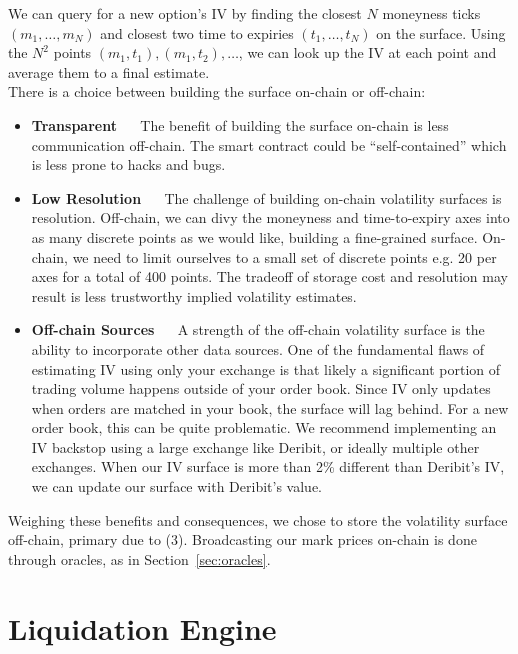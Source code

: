 \documentclass{article}
\begin{document}
\noindent We can query for a new option's IV by finding the closest $N$ moneyness ticks $(m_1, \ldots, m_N)$ and closest two time to expiries $(t_1, \ldots, t_N)$ on the surface.  Using the $N^2$ points $(m_1, t_1), (m_1, t_2), \ldots$, we can look up the IV at each point and average them to a final estimate. \\

\noindent There is a choice between building the surface on-chain or off-chain:

\begin{itemize}
    \item \textbf{Transparent} $\quad$ The benefit of building the surface on-chain is less communication off-chain. The smart contract could be ``self-contained'' which is less prone to hacks and bugs.
    \item \textbf{Low Resolution} $\quad$ The challenge of building on-chain volatility surfaces is resolution. Off-chain, we can divy the moneyness and time-to-expiry axes into as many discrete points as we would like, building a fine-grained surface. On-chain, we need to limit ourselves to a small set of discrete points e.g. 20 per axes for a total of 400 points. The tradeoff of storage cost and resolution may result is less trustworthy implied volatility estimates.
    \item \textbf{Off-chain Sources} $\quad$ A strength of the off-chain volatility surface is the ability to incorporate other data sources. One of the fundamental flaws of estimating IV using only your exchange is that likely a significant portion of trading volume happens outside of your order book. Since IV only updates when orders are matched in your book, the surface will lag behind. For a new order book, this can be quite problematic. We recommend implementing an IV backstop using a large exchange like Deribit, or ideally multiple other exchanges. When our IV surface is more than 2\% different than Deribit's IV, we can update our surface with Deribit's value.
\end{itemize}

\noindent Weighing these benefits and consequences, we chose to store the volatility surface off-chain, primary due to (3). Broadcasting our mark prices on-chain is done through oracles, as in Section~\ref{sec:oracles}.
 
\section{Liquidation Engine}
\label{sec:liquidation}
\end{document}
